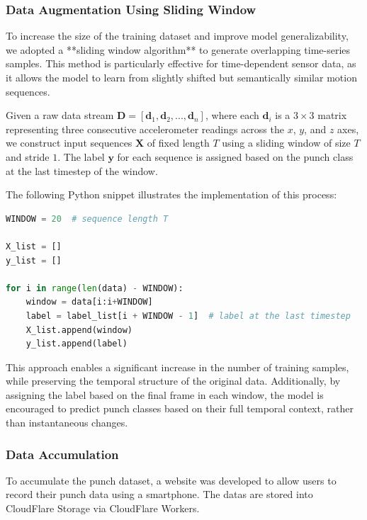 \documentclass{article}
\begin{document}
\subsubsection{Data Augmentation Using Sliding Window}

To increase the size of the training dataset and improve model generalizability, we adopted a **sliding window algorithm** to generate overlapping time-series samples. This method is particularly effective for time-dependent sensor data, as it allows the model to learn from slightly shifted but semantically similar motion sequences.

Given a raw data stream $\mathbf{D} = [\mathbf{d}_1, \mathbf{d}_2, ..., \mathbf{d}_n]$, where each $\mathbf{d}_i$ is a $3 \times 3$ matrix representing three consecutive accelerometer readings across the $x$, $y$, and $z$ axes, we construct input sequences $\mathbf{X}$ of fixed length $T$ using a sliding window of size $T$ and stride $1$. The label $\mathbf{y}$ for each sequence is assigned based on the punch class at the last timestep of the window.

The following Python snippet illustrates the implementation of this process:

\begin{lstlisting}[language=Python, caption={Sliding window algorithm for data augmentation}]
WINDOW = 20  # sequence length T

X_list = []
y_list = []

for i in range(len(data) - WINDOW):
    window = data[i:i+WINDOW]
    label = label_list[i + WINDOW - 1]  # label at the last timestep
    X_list.append(window)
    y_list.append(label)
\end{lstlisting}

This approach enables a significant increase in the number of training samples, while preserving the temporal structure of the original data. Additionally, by assigning the label based on the final frame in each window, the model is encouraged to predict punch classes based on their full temporal context, rather than instantaneous changes.






\subsubsection{Data Accumulation}
To accumulate the punch dataset, a website was developed to allow users to record their punch data using a smartphone. The datas are stored into CloudFlare Storage via CloudFlare Workers.
\end{document}
